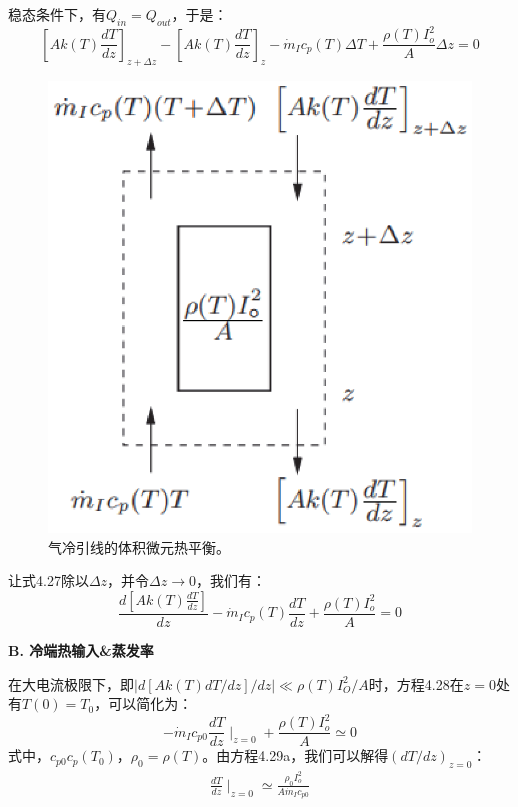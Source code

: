 稳态条件下，有$Q_{in}=Q_{out}$，于是：
\begin{equation}%
\left[Ak(T)\frac{dT}{dz}\right]_{z+\Delta z}-\left[Ak(T)\frac{dT}{dz}\right]_z-\dot{m}_Ic_p(T)\Delta T+\frac{\rho(T)I_{o}^{2}}{A}\Delta z=0
\end{equation}

\begin{figure}[htbp]
	\centering
	\includegraphics[scale=0.6]{chpt4/figs/fig4.20.eps}
	\caption{气冷引线的体积微元热平衡。}
\end{figure}

让式4.27除以$\Delta z$，并令$\Delta z\rightarrow 0$，我们有：
\begin{equation}%
\frac{d[Ak(T)\frac{dT}{dz}]}{dz}-\dot{m}_Ic_p(T)\frac{dT}{dz}+\frac{\rho(T)I_{o}^{2}}{A}=0
\end{equation}

\textbf{B. 冷端热输入\&蒸发率}

在大电流极限下，即$|d[Ak(T)dT/dz]/dz|\ll\rho(T)I_O^2/A$时，方程4.28在$z=0$处有$T(0)=T_0$，可以简化为：
\begin{equation}%
-\dot{m}_Ic_{p0}\frac{dT}{dz}\mid_{z=0}+\frac{\rho(T)I_{o}^{2}}{A}\simeq 0
\end{equation}
式中，$c_{p0}c_{p}(T_0)$，$\rho_0=\rho(T)$。由方程4.29a，我们可以解得$(dT/dz)_{z=0}$：
\begin{align*}%
\frac{dT}{dz}\mid_{z=0}\simeq\frac{\rho_0I_{o}^{2}}{A\dot{m}_Ic_{p0}} \tag{4.29b}
\end{align*}

